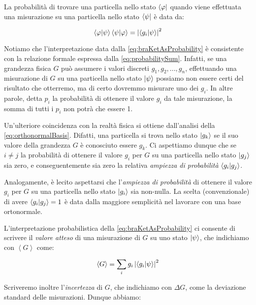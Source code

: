 La probabilità di trovare una particella nello stato $\bra{\varphi}$ quando viene effettuata una misurazione su una particella nello stato $\bra{\psi}$ è data da:

	\begin{equation} \label{eq:braKetAsProbability}
		\braket{\varphi}{\psi} \braket{\psi}{\varphi} = \left | \braket{g_i}{\psi} \right |^2
	\end{equation}

Notiamo che l'interpretazione data dalla \eqref{eq:braKetAsProbability} è consistente con la relazione formale espressa dalla \eqref{eq:probabilitySum}. Infatti, se una grandezza fisica $G$ può assumere i valori discreti $g_1, g_2, ..., g_n$, effettuando una misurazione di $G$ su una particella nello stato $\ket{\psi}$ possiamo non essere certi del risultato che otterremo, ma di certo dovremmo misurare uno dei $g_i$. In altre parole, detta $p_i$ la probabilità di ottenere il valore $g_i$ da tale misurazione, la somma di tutti i $p_i$ non potrà che essere 1.

Un'ulteriore coincidenza con la realtà fisica si ottiene dall'analisi della \eqref{eq:orthonormalBasis}. Difatti, una particella si trova nello stato $\ket{g_k}$ se il suo valore della grandezza $G$ è conosciuto essere $g_k$. Ci aspettiamo dunque che se $i \neq j$ la probabilità di ottenere il valore $g_i$ per $G$ su una particella nello stato $\ket{g_j}$ sia zero, e conseguentemente sia zero la relativa \textit{ampiezza di probabilità} $\braket{g_i}{g_j}$.

Analogamente, è lecito aspettarsi che l'\textit{ampiezza di probabilità} di ottenere il valore $g_i$ per $G$ su una particella nello stato $\ket{g_i}$ sia non-nulla. La scelta (convenzionale) di avere $\braket{g_i}{g_j} = 1$ è data dalla maggiore semplicità nel lavorare con una base ortonormale.

L'interpretazione probabilistica della \eqref{eq:braKetAsProbability} ci consente di scrivere il \textit{valore atteso} di una misurazione di $G$ su uno stato $\ket{\psi}$, che indichiamo con $\left \langle G \right \rangle$ come:

	\begin{equation}
		\left \langle G \right \rangle = \sum_i g_i \left | \braket{g_i}{\psi} \right |^2
	\end{equation}

Scriveremo inoltre l'\textit{incertezza} di $G$, che indichiamo con $\Delta G$, come la deviazione standard delle misurazioni. Dunque abbiamo:

